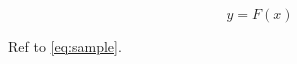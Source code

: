 \documentclass{article}
\begin{document}
\begin{equation}
y = F(x) \label{eq:sample}
\end{equation}

Ref to \ref{eq:sample}.
\end{document}
